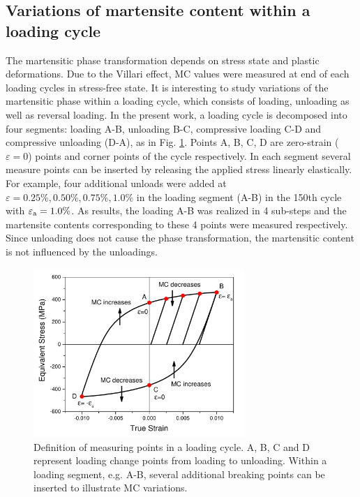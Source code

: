 \documentclass[final,5p,times,onecolumn,10pt,sort&compress]{elsarticle}
\begin{document}
\subsection{Variations of martensite content within a loading cycle}

The martensitic phase transformation depends on stress state and plastic deformations. Due to the Villari effect, MC values were measured at end of each loading cycles in stress-free state. It is interesting to study variations of the martensitic phase within a loading cycle, which consists of loading, unloading as well as reversal loading. In the present work, a loading cycle is decomposed into four segments: loading A-B, unloading B-C, compressive loading C-D and compressive unloading (D-A), as in Fig. \ref{fig:PointDefinition}. Points A, B, C, D are zero-strain ($\varepsilon=0$) points and corner points of the cycle respectively.  In each segment several measure points can be inserted by releasing the applied stress linearly elastically. For example, four additional unloads were added at $\varepsilon=0.25\%,0.50\%,0.75\%,1.0\%$ in the loading segment (A-B) in the 150th cycle with $\varepsilon_{\rm a}=1.0\%$. As results, the loading A-B was realized in 4 sub-steps and the martensite contents corresponding to these 4 points were measured respectively. Since unloading does not cause the phase transformation, the martensitic content is not influenced by the unloadings.

\begin{figure}[!h]
  \begin{center}
  \includegraphics[width=8cm]{Steploadingcurve.pdf}
  \caption{Definition of measuring points in a loading cycle. A, B, C and D represent loading change points from loading to unloading.  Within a loading segment, e.g. A-B, several additional breaking points can be inserted to illustrate MC variations.}
  \label{fig:PointDefinition}
  \end{center}
\end{figure}
\end{document}
